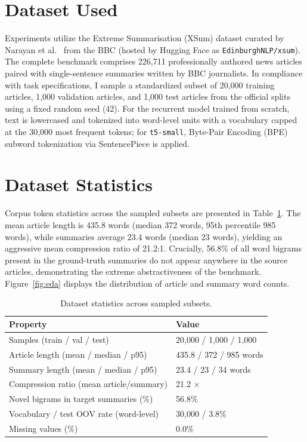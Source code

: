 \documentclass[conference,10pt,a4paper]{IEEEtran}
\begin{document}
\section{Dataset Used}
Experiments utilize the Extreme Summarisation (XSum) dataset curated by Narayan et al.~\cite{xsum} from the BBC (hosted by Hugging Face as \texttt{EdinburghNLP/xsum}). The complete benchmark comprises 226,711 professionally authored news articles paired with single-sentence summaries written by BBC journalists. In compliance with task specifications, I sample a standardized subset of 20,000 training articles, 1,000 validation articles, and 1,000 test articles from the official splits using a fixed random seed (42). For the recurrent model trained from scratch, text is lowercased and tokenized into word-level units with a vocabulary capped at the 30,000 most frequent tokens; for \texttt{t5-small}, Byte-Pair Encoding (BPE) subword tokenization via SentencePiece is applied.

\section{Dataset Statistics}
Corpus token statistics across the sampled subsets are presented in Table~\ref{tab:stats}. The mean article length is 435.8 words (median 372 words, 95th percentile 985 words), while summaries average 23.4 words (median 23 words), yielding an aggressive mean compression ratio of 21.2:1. Crucially, 56.8\% of all word bigrams present in the ground-truth summaries do not appear anywhere in the source articles, demonstrating the extreme abstractiveness of the benchmark. Figure~\ref{fig:eda} displays the distribution of article and summary word counts.

\begin{table}[h]
\centering
\caption{Dataset statistics across sampled subsets.}
\label{tab:stats}
\begin{tabular}{ll}
\toprule
Property & Value \\
\midrule
Samples (train / val / test) & 20,000 / 1,000 / 1,000 \\
Article length (mean / median / p95) & 435.8 / 372 / 985 words \\
Summary length (mean / median / p95) & 23.4 / 23 / 34 words \\
Compression ratio (mean article/summary) & 21.2 $\times$ \\
Novel bigrams in target summaries (\%) & 56.8\% \\
Vocabulary / test OOV rate (word-level) & 30,000 / 3.8\% \\
Missing values (\%) & 0.0\% \\
\bottomrule
\end{tabular}
\end{table}
\end{document}
